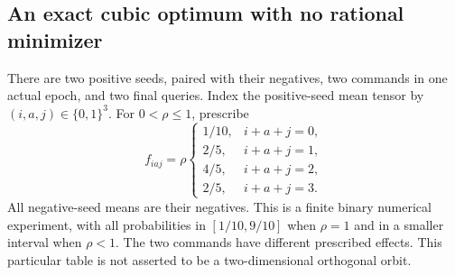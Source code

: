 \subsection{An exact cubic optimum with no rational minimizer}
There are two positive seeds, paired with their negatives, two commands
in one actual epoch, and two final queries. Index the positive-seed
mean tensor by $(i,a,j)\in\{0,1\}^3$. For $0<\rho\le1$, prescribe
\begin{equation}\label{eq:cubic-target49}
 f_{iaj}=\rho\begin{cases}
 1/10,&i+a+j=0,\\
 2/5,&i+a+j=1,\\
 4/5,&i+a+j=2,\\
 2/5,&i+a+j=3.
 \end{cases}
\end{equation}
All negative-seed means are their negatives. This is a finite binary
numerical experiment, with all probabilities in $[1/10,9/10]$ when
$\rho=1$ and in a smaller interval when $\rho<1$.
The two commands have different prescribed effects. This particular
table is not asserted to be a two-dimensional orthogonal orbit.

